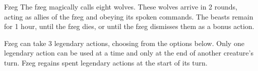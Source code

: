 \documentclass[10pt,a4paper,twoside,twocolumn,openany,bg=print,nodeprecatedcode]{dndbook}
\begin{document}
\begin{DndMonster}[float*=t]{Fzeg}
The fzeg magically calls eight wolves. These wolves arrive in 2 rounds, acting as allies of the fzeg and obeying its spoken commands. The beasts remain for 1 hour, until the fzeg dies, or until the fzeg dismisses them as a bonus action.
\par
{}
Fzeg can take 3 legendary actions, choosing from the options below. Only one legendary action can be used at a time and only at the end of another creature's turn. Fzeg regains spent legendary actions at the start of its turn.
\begin{DndMonsterLegendaryActions}
\end{DndMonsterLegendaryActions}
\end{DndMonster}
\end{document}
